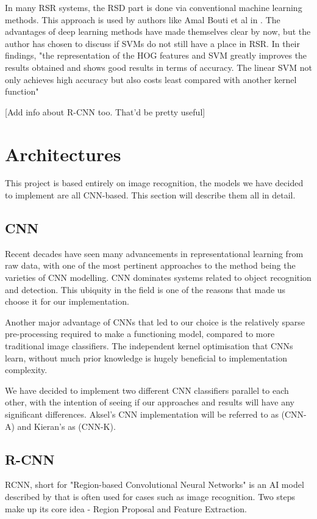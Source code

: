 \documentclass[12pt, landscape]{article}
\begin{document}
\begin{multicols}{3}
In many RSR systems, the RSD part is done via conventional machine learning
methods. This approach is used by authors like Amal Bouti et al in
\citep{Recognition1}. The advantages of deep learning methods have made
themselves clear by now, but the author has chosen to discuss if SVMs do not still
have a place in RSR. In their findings, "the representation of the HOG features
and SVM greatly improves the results obtained and shows good results in terms of
accuracy. The linear SVM not only achieves high accuracy but also costs least
compared with another kernel function" \citep[6722 A. Bouti et al]{Recognition1}

[Add info about R-CNN too. That'd be pretty useful]

\section{Architectures}
This project is based entirely on image recognition, the models we have decided
to implement are all CNN-based. This section will describe them all in detail.

\subsection{CNN}
Recent decades have seen many advancements in representational learning from raw
data, with one of the most pertinent approaches to the method being the
varieties of CNN modelling. CNN dominates systems related to object recognition
and detection. This ubiquity in the field is one of the reasons that made us
choose it for our implementation.

Another major advantage of CNNs that led to our choice is the relatively sparse
pre-processing required to make a functioning model, compared to more
traditional image classifiers. The independent kernel optimisation that CNNs
learn, without much prior knowledge is hugely beneficial to implementation
complexity.

We have decided to implement two different CNN classifiers parallel to
each other, with the intention of seeing if our approaches and results will have
any significant differences. Aksel's CNN implementation will be referred to as
(CNN-A) and Kieran's as (CNN-K).

\subsection{R-CNN}
RCNN, short for "Region-based Convolutional Neural Networks" is an AI model
described by \citep[Girshick et al.]{girshick2014rich} that is often used for
cases such as image recognition. Two steps make up its core idea - Region
Proposal and Feature Extraction.


\end{multicols}
\end{document}
